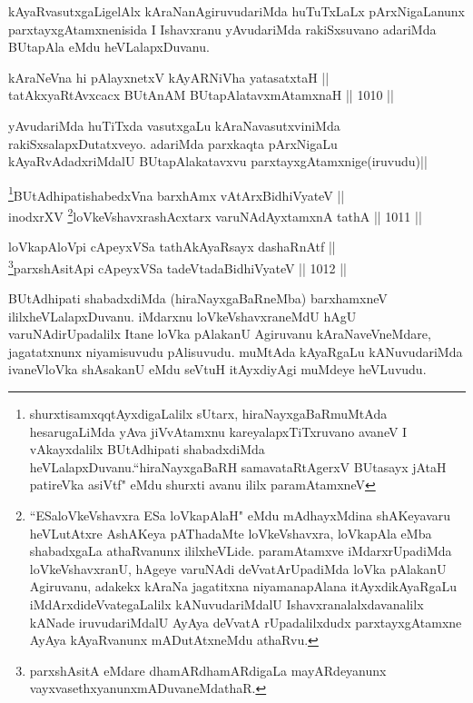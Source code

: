 \begin{artha}
kAyaRvasutxgaLigelAlx kAraNanAgiruvudariMda huTuTxLaLx pArxNigaLanunx parxtayxgAtamxnenisida I Ishavxranu yAvudariMda rakiSxsuvano adariMda BUtapAla eMdu heVLalapxDuvanu.
\end{artha}


\begin{shl}
kAraNeVna hi pAlayxnetxV kAyARNiVha yatasatxtaH || \\
tatAkxyaRtAvxcacx BUtAnAM BUtapAlatavxmAtamxnaH \hfill || 1010 ||  
\end{shl}

\begin{artha}
yAvudariMda huTiTxda vasutxgaLu kAraNavasutxviniMda rakiSxsalapxDu\-tatxveyo. adariMda parxkaqta pArxNigaLu kAyaRvAdadxriMdalU BUtapAlakatavxvu parxtayxgAtamxnige(iruvudu)||
\end{artha}

\begin{shl}
\footnote{shurxtisamxqqtAyxdigaLalilx sUtarx, hiraNayxgaBaRmuMtAda hesarugaLiMda yAva jiVvAtamxnu kareya\-lapxTiTxruvano avaneV I vAkayxdalilx BUtAdhipati shabadxdiMda heVLalapxDuvanu.``hiraNayxgaBaRH samavataRtAgerxV BUtasayx jAtaH patireVka asiVtf" eMdu shurxti avanu ililx paramAtamxneV}BUtAdhipatishabedxVna barxhAmx vA\s tArxBidhiVyateV || \\
inodxrXV \footnote{``ESaloVkeVshavxra ESa loVkapAlaH" eMdu mAdhayxMdina shAKeyavaru heVLutAtxre AshAKeya pAThadaMte loVkeVshavxra, loVkapAla eMba shabadxgaLa athaRvanunx ililxheVLide. paramAtamxve iMdarxrUpadiMda loVkeVshavxranU, hAgeye varuNAdi deVvatArUpadiMda loVka pAlakanU Agiruvanu, adakekx kAraNa jagatitxna niyamanapAlana itAyxdikAyaRgaLu iMdArxdideVvategaLalilx kANuvudariMdalU Ishavxranalalxdavanalilx kANade iruvudariMdalU AyAya deVvatA rUpadalilxdudx parxtayxgAtamxne AyAya kAyaRvanunx mADutAtxneMdu athaRvu.}loVkeVshavxrashAcxtarx varuNAdAyxtamxnA tathA \hfill || 1011 ||  
\end{shl}
				
\begin{shl}
loVkapAloV\s pi cApeyxVSa tathAkAyaRsayx dashaRnAtf || \\
\footnote{parxshAsitA eMdare dhamARdhamARdigaLa mayARdeyanunx vayxvasethxyanunx\break mADuvaneMdathaR.}parxshAsitA\s pi cApeyxVSa tadeVtadaBidhiVyateV \hfill || 1012 ||  
\end{shl}


\begin{artha}
BUtAdhipati shabadxdiMda (hiraNayxgaBaRneMba) barxhamxneV ililx\break heVLalapxDuvanu. iMdarxnu loVkeVshavxraneMdU hAgU varuNAdirUpadalilx Itane loVka pAlakanU Agiruvanu kAraNaveVneMdare, jagatatxnunx niyamisuvudu pAlisuvudu. muMtAda kAyaRgaLu kANuvudariMda ivaneVloVka shAsakanU eMdu seVtuH itAyxdiyAgi muMdeye heVLuvudu.
\end{artha}

